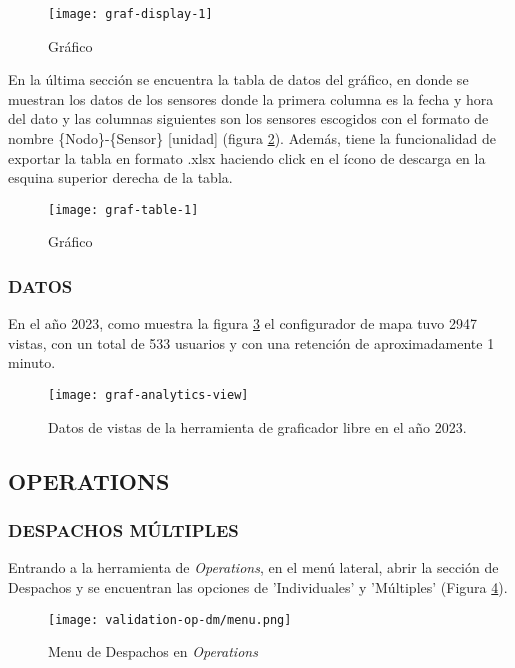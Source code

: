 \begin{figure}[H]
	\centering
	\texttt{[image: graf-display-1]}
	\caption{\label{fig:graf-display-1} Gráfico}
\end{figure}

En la última sección se encuentra la tabla de datos del gráfico, en donde se muestran los datos de los sensores donde la primera columna es la fecha y hora del dato y las columnas siguientes son los sensores escogidos con el formato de nombre \{Nodo\}-\{Sensor\} [unidad] (figura \ref{fig:graf-table-1}). 
Además, tiene la funcionalidad de exportar la tabla en formato .xlsx haciendo click en el ícono de descarga en la esquina superior derecha de la tabla.

\begin{figure}[H]
	\centering
	\texttt{[image: graf-table-1]}
	\caption{\label{fig:graf-table-1} Gráfico}
\end{figure}


\subsubsection{DATOS}

En el año 2023, como muestra la figura \ref{fig:graf-analytics-view} el configurador de mapa tuvo 2947 vistas, con un total de 533 usuarios y con una retención de aproximadamente 1 minuto.
\begin{figure}[H]
	\centering
	\texttt{[image: graf-analytics-view]}
	\caption{\label{fig:graf-analytics-view} Datos de vistas de la herramienta de graficador libre en el año 2023.}
\end{figure}
\fi

\subsection{OPERATIONS}

\subsubsection{DESPACHOS MÚLTIPLES}

Entrando a la herramienta de \textit{Operations}, en el menú lateral, abrir la sección de Despachos y se encuentran las opciones de 'Individuales' y 'Múltiples' (Figura \ref{fig:op-menu}).

\begin{figure}[H]
	\centering
	\texttt{[image: validation-op-dm/menu.png]}
	\caption{\label{fig:op-menu} Menu de Despachos en \textit{Operations}}
\end{figure}

